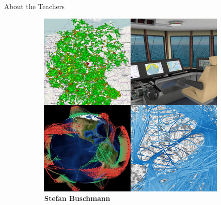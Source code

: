 \begin{frame}{About the Teachers}

	\begin{figure}
	
		\centering
		\begin{subfigure}[b]{0.3\textwidth}
			\centering
			\includegraphics[width=\textwidth]{intro/stefan}
			\caption{\normalsize \textbf{Stefan Buschmann}}
		\end{subfigure}%
		\quad
		\begin{subfigure}[b]{0.3\textwidth}
			\centering

\end{subfigure}
\end{figure}
\end{frame}
